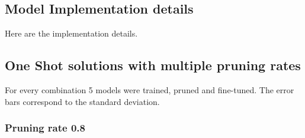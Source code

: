 \label{sec:supplementary}

\subsection{Model Implementation details}
\label{sebsec:implementation_details}
Here are the implementation details.
\subsection*{One Shot solutions with multiple pruning rates}

\label{subsec:OneShotPruningrates}
For every combination 5 models were trained, pruned and fine-tuned. The error bars correspond to the standard deviation.

\subsubsection*{Pruning rate 0.8}

